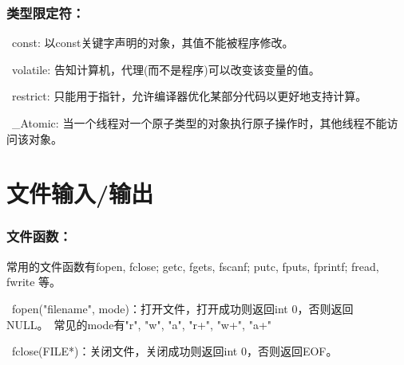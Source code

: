 \documentclass[zihao=-4,UTF8]{report}
\begin{document}
\subsubsection{类型限定符：}
\ const: 以const关键字声明的对象，其值不能被程序修改。\par
{}\ volatile: 告知计算机，代理(而不是程序)可以改变该变量的值。\par
{}\ restrict: 只能用于指针，允许编译器优化某部分代码以更好地支持计算。 \par
{}\ \_Atomic: 当一个线程对一个原子类型的对象执行原子操作时，其他线程不能访问该对象。

\section{文件输入/输出}
\subsubsection{文件函数：}
常用的文件函数有fopen, fclose; getc, fgets, fscanf; putc, fputs,  fprintf; fread, fwrite 等。\par
{}\  fopen("filename", mode)：打开文件，打开成功则返回int 0，否则返回NULL。{\color{gray}\ 常见的mode有"r", "w", "a", "r+", "w+", "a+"}\par
{}\  fclose(FILE*)：关闭文件，关闭成功则返回int 0，否则返回EOF。\par
\end{document}
